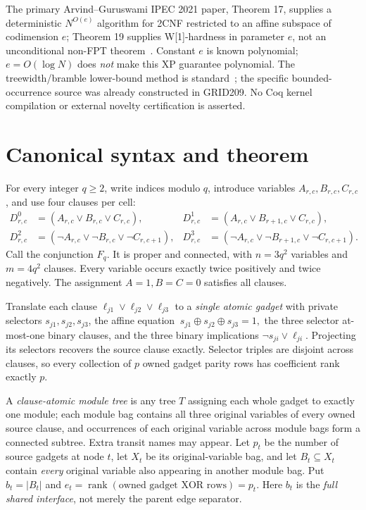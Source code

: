 \documentclass[11pt]{article}
\begin{document}
The primary Arvind--Guruswami IPEC 2021 paper, Theorem 17, supplies a deterministic $N^{O(e)}$ algorithm for 2CNF restricted to an affine subspace of codimension $e$; Theorem 19 supplies W[1]-hardness in parameter $e$, not an unconditional non-FPT theorem~\cite{arvind2021}. Constant $e$ is known polynomial; $e=O(\log N)$ does \emph{not} make this XP guarantee polynomial. The treewidth/bramble lower-bound method is standard~\cite{seymour1993}; the specific bounded-occurrence source was already constructed in GRID209. No Coq kernel compilation or external novelty certification is asserted.

\section{Canonical syntax and theorem}
For every integer $q\ge2$, write indices modulo $q$, introduce variables $A_{r,c},B_{r,c},C_{r,c}$, and use four clauses per cell:
\begin{align*}
D^0_{r,c}&=(A_{r,c}\vee B_{r,c}\vee C_{r,c}),&
D^1_{r,c}&=(A_{r,c}\vee B_{r+1,c}\vee C_{r,c}),\\
D^2_{r,c}&=(\neg A_{r,c}\vee\neg B_{r,c}\vee\neg C_{r,c+1}),&
D^3_{r,c}&=(\neg A_{r,c}\vee\neg B_{r+1,c}\vee\neg C_{r,c+1}).
\end{align*}
Call the conjunction $F_q$. It is proper and connected, with $n=3q^2$ variables and $m=4q^2$ clauses. Every variable occurs exactly twice positively and twice negatively. The assignment $A=1,B=C=0$ satisfies all clauses.

Translate each clause $\ell_{j1}\vee\ell_{j2}\vee\ell_{j3}$ to a \emph{single atomic gadget} with private selectors $s_{j1},s_{j2},s_{j3}$, the affine equation
$\ s_{j1}\oplus s_{j2}\oplus s_{j3}=1,$
the three selector at-most-one binary clauses, and the three binary implications $\neg s_{ji}\vee\ell_{ji}$. Projecting its selectors recovers the source clause exactly. Selector triples are disjoint across clauses, so every collection of $p$ owned gadget parity rows has coefficient rank exactly $p$.

A \emph{clause-atomic module tree} is any tree $T$ assigning each whole gadget to exactly one module; each module bag contains all three original variables of every owned source clause, and occurrences of each original variable across module bags form a connected subtree. Extra transit names may appear. Let $p_t$ be the number of source gadgets at node $t$, let $X_t$ be its original-variable bag, and let $B_t\subseteq X_t$ contain \emph{every} original variable also appearing in another module bag. Put $b_t=|B_t|$ and $e_t=\operatorname{rank}(\text{owned gadget XOR rows})=p_t$. Here $b_t$ is the \emph{full shared interface}, not merely the parent edge separator.
\end{document}
